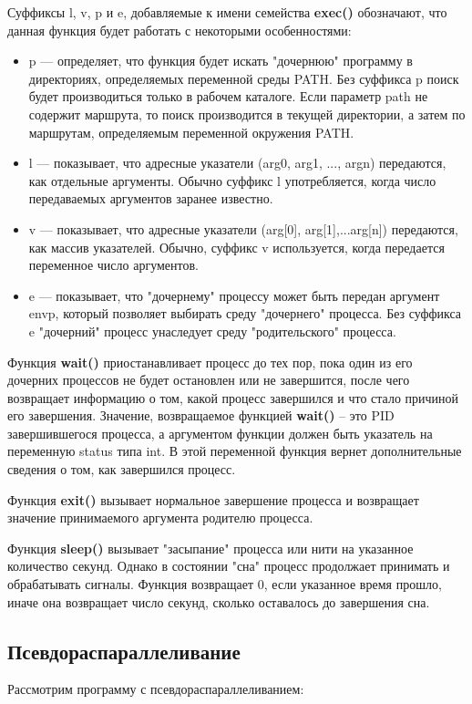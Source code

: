 \documentclass[a4paper]{article}
\begin{document}
	Суффиксы l, v, p и e, добавляемые к имени семейства \textbf{exec()} обозначают, что данная функция будет работать с некоторыми особенностями:
	\begin{itemize}
		\item p --- определяет, что функция будет искать "дочернюю" программу в директориях, определяемых переменной среды PATH. Без суффикса p поиск будет  производиться только в рабочем каталоге. Если параметр path  не  содержит  маршрута,  то поиск  производится  в  текущей  директории,  а затем  по  маршрутам,  определяемым  переменной окружения PATH.
		\item l --- показывает, что адресные указатели (arg0, arg1, ..., argn) передаются, как отдельные аргументы. Обычно суффикс l употребляется, когда число передаваемых аргументов заранее известно.
		\item v --- показывает,  что  адресные  указатели  (arg[0], arg[1],...arg[n]) передаются, как массив указателей. Обычно, суффикс  v  используется, когда передается переменное число аргументов.
		\item e --- показывает, что "дочернему" процессу может быть передан аргумент envp, который позволяет выбирать среду "дочернего"   процесса. Без суффикса e "дочерний" процесс унаследует среду "родительского" процесса.
	\end{itemize}
	
	Функция \textbf{wait()} приостанавливает процесс до тех пор, пока один из его дочерних процессов не будет остановлен или не завершится, после чего возвращает информацию о том, какой процесс завершился и что стало причиной его завершения. Значение, возвращаемое функцией \textbf{wait()} – это PID завершившегося процесса, а аргументом функции должен быть указатель на переменную status типа int. В этой переменной функция вернет дополнительные сведения о том, как завершился процесс. 
	
	Функция \textbf{exit()} вызывает нормальное завершение процесса и возвращает значение принимаемого аргумента родителю процесса.
	
	Функция \textbf{sleep()} вызывает "засыпание" процесса или нити на указанное количество секунд. Однако в состоянии "сна" процесс продолжает принимать и обрабатывать сигналы. Функция возвращает 0, если указанное время прошло, иначе она возвращает число секунд, сколько оставалось до завершения сна.
	
\subsection{Псевдораспараллеливание}
	Рассмотрим программу с псевдораспараллеливанием:
	
	
\end{document}
